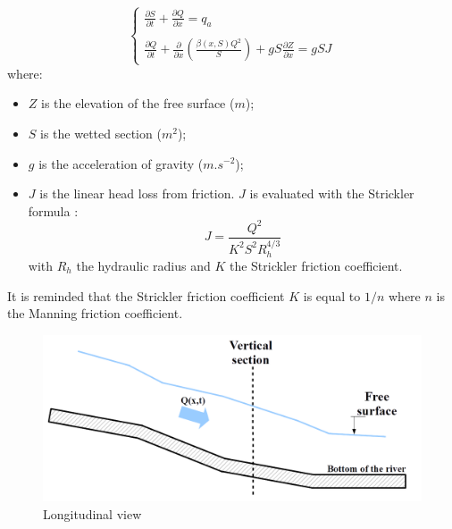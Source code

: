 \begin{equation}
 \label{SVT2}
 \left \lbrace
  \begin{array}{l}
    \frac{\partial S}{\partial t} + \frac{\partial Q}{\partial x} = q_a \\
    \\
    \frac{\partial Q}{\partial t} + \frac{\partial}{\partial x} \left ( \frac{\beta(x,S) Q^2}{S}\right ) + g S \frac{\partial Z}{\partial x} = g S J
  \end{array}
 \right.
\end{equation}
where:
\begin{itemize}
 \item $Z$ is the elevation of the free surface ($m$);
 \item $S$ is the wetted section ($m^2$);
 \item $g$ is the acceleration of gravity ($m.s^{-2}$);
 \item $J$ is the linear head loss from friction. $J$ is evaluated with the Strickler formula :
  \begin{equation}
    J = \frac{Q^2}{K^2 S^2 R_{h}^{4/3}}
  \end{equation}
  with $R_h$ the hydraulic radius and $K$ the Strickler friction coefficient.
\end{itemize}


It is reminded that the Strickler friction coefficient $K$ is equal to $1/n$ where $n$ is the Manning friction coefficient.

\begin{figure}[H]
 \begin{center}
  \includegraphics[width=\textwidth]{Figures/VueLong.png}
  \caption{Longitudinal view}
 \end{center}
\end{figure}

